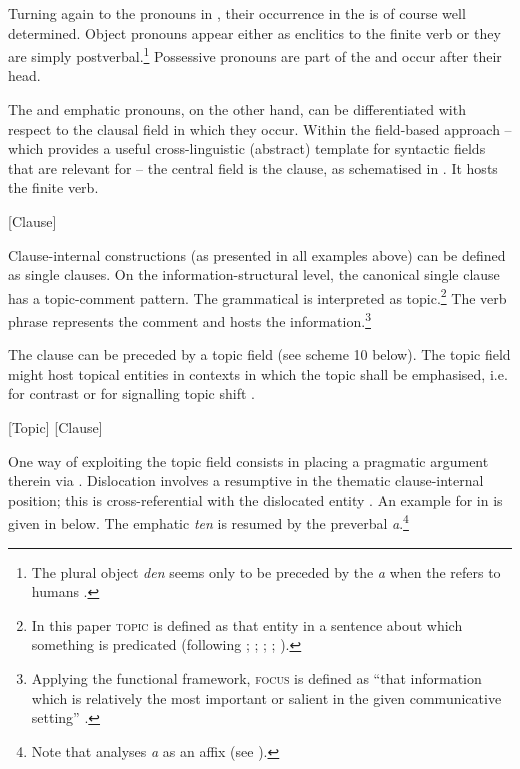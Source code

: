 \documentclass[output=paper
,newtxmath
,modfonts
,nonflat]{langsci/langscibook}
\begin{document}
Turning again to the pronouns in , their occurrence in the  is of course well determined. Object pronouns appear either as enclitics to the finite verb or they are simply postverbal.\footnote{The plural object  \textit{den} seems only to be preceded by the  \textit{a} when the  refers to humans \citep[112-116]{Renaudier2012}.} Possessive pronouns are part of the  and occur after their head.

The  and emphatic pronouns, on the other hand, can be differentiated with respect to the clausal field in which they occur. Within the field-based approach -- which provides a useful cross-linguistic (abstract) template for syntactic fields that are relevant for  \citep[see][]{Good2010,Güldemanninprep,Apeletal15} -- the central field is the clause, as schematised in . It hosts the finite verb.

\ea\label{ex:apel:9} [Clause]
\z

Clause-internal constructions (as presented in all examples above) can be defined as single clauses. On the information-structural level, the canonical single clause has a topic-comment pattern. The grammatical  is interpreted as topic.\footnote{In this paper \textsc{topic} is defined as that entity in a sentence about which something is predicated (following \citealt{Strawson1964}; \citealt{Hornby1971}; \citealt{Dik1997}; \citealt{Reinhart1982}; \citealt{Lambrecht1994}).} The verb phrase represents the comment and hosts the  information.\footnote{Applying the functional framework, \textsc{focus} is defined as “that information which is relatively the most important or salient in the given communicative setting” \citep[326]{Dik1997}.}

The clause can be preceded by a topic field (see scheme 10 below). The topic field might host topical entities in contexts in which the topic shall be emphasised, i.e. for contrast or for signalling topic shift \citep[see][153]{Givon76}.

\ea\label{ex:apel:10}
[Topic] [Clause]
\z

One way of exploiting the topic field consists in placing a pragmatic argument therein via . Dislocation involves a resumptive  in the thematic clause-internal position; this  is cross-referential with the dislocated entity \citep{GregoryMichaelis01,Lambrecht2001}. An example for  in  is given in  below. The emphatic  \textit{ten} is resumed by the preverbal  \textit{a}.\footnote{Note that \citet{Renaudier2012} analyses \textit{a} as an affix (see ).} 
\end{document}
